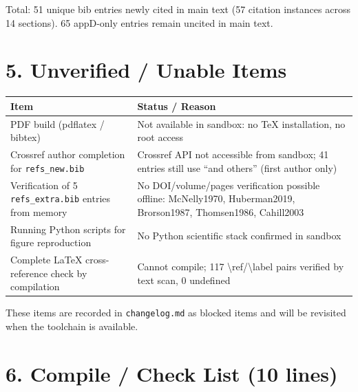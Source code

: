 \documentclass[12pt,a4paper]{article}
\begin{document}
Total: 51 unique bib entries newly cited in main text (57 citation instances across 14 sections). 65 appD-only entries remain uncited in main text.

\section*{5. Unverified / Unable Items}

\begin{tabularx}{\textwidth}{@{}lX@{}}\toprule
\textbf{Item} & \textbf{Status / Reason}\\\midrule
PDF build (pdflatex / bibtex) & Not available in sandbox: no TeX installation, no root access\\
Crossref author completion for {\tt refs\_new.bib} & Crossref API not accessible from sandbox; 41 entries still use ``and others'' (first author only)\\
Verification of 5 {\tt refs\_extra.bib} entries from memory & No DOI/volume/pages verification possible offline: McNelly1970, Huberman2019, Brorson1987, Thomsen1986, Cahill2003\\
Running Python scripts for figure reproduction & No Python scientific stack confirmed in sandbox\\
Complete LaTeX cross-reference check by compilation & Cannot compile; 117 \textbackslash ref/\textbackslash label pairs verified by text scan, 0 undefined\\
\bottomrule
\end{tabularx}

These items are recorded in {\tt changelog.md} as blocked items and will be revisited when the toolchain is available.

\section*{6. Compile / Check List (10 lines)}
\end{document}
